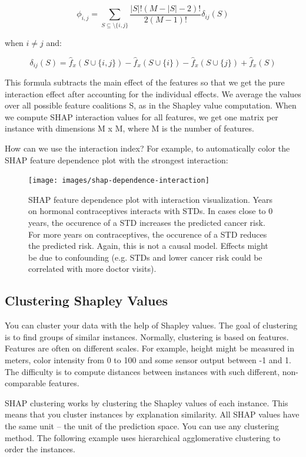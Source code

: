 \documentclass[
  11pt,
]{scrbook}
\begin{document}
\[\phi_{i,j}=\sum_{S\subseteq\setminus\{i,j\}}\frac{|S|!(M-|S|-2)!}{2(M-1)!}\delta_{ij}(S)\]

when \(i\neq{}j\) and:

\[\delta_{ij}(S)=\hat{f}_x(S\cup\{i,j\})-\hat{f}_x(S\cup\{i\})-\hat{f}_x(S\cup\{j\})+\hat{f}_x(S)\]

This formula subtracts the main effect of the features so that we get the pure interaction effect after accounting for the individual effects.
We average the values over all possible feature coalitions S, as in the Shapley value computation.
When we compute SHAP interaction values for all features, we get one matrix per instance with dimensions M x M, where M is the number of features.

How can we use the interaction index?
For example, to automatically color the SHAP feature dependence plot with the strongest interaction:

\begin{figure}

{\centering \texttt{[image: images/shap-dependence-interaction]} 

}

\caption{SHAP feature dependence plot with interaction visualization. Years on hormonal contraceptives interacts with STDs. In cases close to 0 years, the occurence of a STD increases the predicted cancer risk. For more years on contraceptives, the occurence of a STD reduces the predicted risk. Again, this is not a causal model. Effects might be due to confounding (e.g. STDs and lower cancer risk could be correlated with more doctor visits).}\label{fig:unnamed-chunk-48}
\end{figure}

\hypertarget{clustering-shapley-values}{%
\subsection{Clustering Shapley Values}\label{clustering-shapley-values}}

You can cluster your data with the help of Shapley values.
The goal of clustering is to find groups of similar instances.
Normally, clustering is based on features.
Features are often on different scales.
For example, height might be measured in meters, color intensity from 0 to 100 and some sensor output between -1 and 1.
The difficulty is to compute distances between instances with such different, non-comparable features.

SHAP clustering works by clustering the Shapley values of each instance.
This means that you cluster instances by explanation similarity.
All SHAP values have the same unit -- the unit of the prediction space.
You can use any clustering method.
The following example uses hierarchical agglomerative clustering to order the instances.
\end{document}
